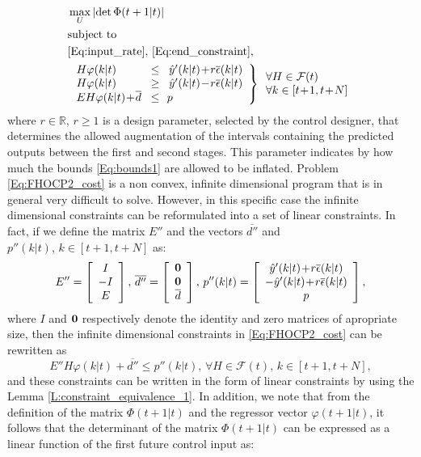 \documentclass[10 pt, letterpaper]{article}
\newcommand{\beq}{\begin{equation}}
\newcommand{\eeq}{\end{equation}}
\newcommand{\ba}{\begin{array}}
\newcommand{\ea}{\end{array}}
\newcommand{\bR}{{\mathbb R}}
\begin{document}
\beq\label{Eq:FHOCP2_cost}
\begin{aligned}
&\max \limits_U \left|\det \Phi(t+1|t)   \right|\\
&\text {subject to}\\
&\eqref{Eq:input_rate}, \, \eqref{Eq:end_constraint},\\
&\left.\ba{lll}
H\varphi(k|t)&\!\leq\!& \hat{y}'(k|t)\!+\!r\overline{\epsilon}(k|t)\\
H\varphi(k|t)&\!\geq\! &\hat{y}'(k|t)\!-\!r\overline{\epsilon}(k|t)\\
EH\varphi(k|t)\!+\!\overline{d}&\! \leq\!&\! p
\ea \right\}\ba{ll}\forall H\in \mathcal{F}(t)\\ \forall k\in[t\!+\!1, t\!+\!N] \ea
\end{aligned}
\eeq
where $r\in \bR$, $r\geq 1$ is a design parameter, selected by the control designer, that determines the allowed augmentation of the intervals containing the predicted outputs between the first and second stages. This parameter indicates by how much the bounds \eqref{Eq:bounds1} are allowed to be inflated. Problem \eqref{Eq:FHOCP2_cost} is a non convex, infinite dimensional program that is in general very difficult to solve. However, in this specific case the infinite dimensional constraints can be reformulated into a set of linear constraints. In fact, if we define the matrix $E''$ and the vectors $\overline{d''}$ and $p''(k|t),\, k\in [t+1,t+N]$ as:
\beq\label{Eq:redefine_matrices}
E''=\left[ \ba{c} I\\ -I\\ E \ea \right],\, \overline{d''}=\left[\ba{c} \bold{0}\\ \bold{0}\\ \overline{d} \ea   \right],\, p''(k|t)=\left[ \ba{c} \hat{y}'(k|t)\!+\!r\overline{\epsilon}(k|t)\\-\hat{y}'(k|t)\!+\!r\overline{\epsilon}(k|t)\\p\ea \right],
\eeq
where $I$ and $\bold{0}$ respectively denote the identity and zero matrices of apropriate size, then the infinite dimensional constraints in \eqref{Eq:FHOCP2_cost} can be rewritten as
\beq
E''H\varphi(k|t)\!+\!\overline{d''}\leq p''(k|t),\, \forall H\in \mathcal{F}(t),\, k\in[t\!+\!1,t\!+\!N],
\eeq
and these constraints can be written in the form of linear constraints by using the Lemma \ref{L:constraint_equivalence_1}. In addition, we note that from the definition of the matrix $\Phi(t+1|t)$ and the regressor vector $\varphi(t+1|t)$, it follows that the determinant of the matrix $\Phi(t+1|t)$ can be expressed as a linear function of the first future control input as: 
\end{document}
